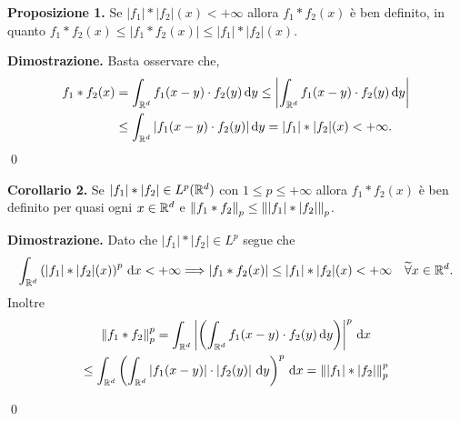 %
%


\textbf{Proposizione 1.} Se $|f_1| \ast |f_2| (x) < +\infty$ allora $f_1 \ast f_2(x)$ è ben definito, in quanto $f_1 \ast f_2(x) \leq |f_1 \ast f_2(x)| \leq |f_1| \ast |f_2|(x)$.

\textbf{Dimostrazione.} Basta osservare che,
%
\begin{align*}
	f_1 \ast f_2(x) & = \int_{\mathbb R^d} f_1(x-y) \cdot f_2(y) \,\mathrm{d} y 
	\leq \left| \int_{\mathbb R^d} f_1(x-y) \cdot f_2(y) \,\mathrm{d} y \right| \\
	& \leq \int_{\mathbb R^d} |f_1(x-y) \cdot f_2(y)| \,\mathrm{d} y
	= |f_1| \ast |f_2|(x) < +\infty.
\end{align*}
\qed

\textbf{Corollario 2.} Se $|f_1| \ast |f_2| \in L^p(\mathbb R^d)$ con $1 \leq p \leq +\infty$ allora $f_1 \ast f_2(x)$ è ben definito per quasi ogni $x \in \mathbb R^d$ e $\left\lVert f_1 \ast f_2 \right\rVert_p \leq \left\lVert |f_1| \ast |f_2| \right\rVert_p$.

\textbf{Dimostrazione.} Dato che $|f_1| \ast |f_2| \in L^p$ segue che
$$
	\int_{\mathbb R^d} \left( |f_1| \ast |f_2|(x) \right)^p \,\mathrm{d} x < +\infty
	\Longrightarrow |f_1 \ast f_2(x)| \leq |f_1| \ast |f_2|(x) < +\infty \quad \widetilde{\forall} x \in \mathbb R^d.
$$
Inoltre
\begin{multline*}
	\left\lVert f_1 \ast f_2 \right\rVert_p^p 
	= \int_{\mathbb R^d} \left| \left( \int_{\mathbb R^d} f_1(x-y) \cdot f_2(y) \,\mathrm{d} y \right) \right|^p \,\mathrm{d} x \\
	\leq \int_{\mathbb R^d} \left( \int_{\mathbb R^d} \left| f_1(x-y) \right| \cdot \left| f_2(y) \right| \,\mathrm{d} y \right)^p \,\mathrm{d} x
	= \left\lVert |f_1| \ast |f_2|  \right\rVert_p^p
\end{multline*}

\qed


